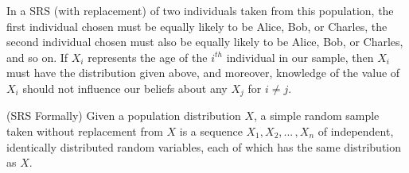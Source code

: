 \begin{center}
    \begin{minipage}{.45\textwidth}
       \centering
      \renewcommand*{\arraystretch}{1.35}
\renewcommand*{\arraystretch}{1}
\vspace{1em}
    \end{minipage}%
    \begin{minipage}{0.5\textwidth}
        \centering
{}
\end{minipage}
\end{center}

\par
In a SRS (with replacement) of two individuals taken from this population, the first individual chosen must be equally likely to be Alice, Bob, or Charles, the second individual chosen must also be equally likely to be Alice, Bob, or Charles, and so on. If $X_i$ represents the age of the $i^{th}$ individual in our sample, then $X_i$ must have the distribution given above, and moreover, knowledge of the value of $X_i$ should not influence our beliefs about any $X_j$ for $i \neq j$.
\par
\begin{defn}\label{FormalSRSDef} (SRS Formally) Given a population distribution $X$, a simple random sample taken without replacement from $X$ is a sequence $X_1, X_2, ... \,, X_n$ of independent, identically distributed random variables, each of which has the same distribution as $X$.
\end{defn}

